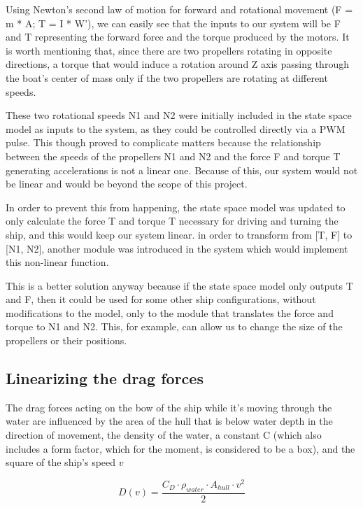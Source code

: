 Using Newton's second law of motion for forward  and rotational movement (F = m * A; T = I * W'), we can easily see that the inputs to our system will be F and T representing the forward force and the torque produced by the motors. It is worth mentioning that, since there are two propellers rotating in opposite directions, a torque that would induce a rotation around Z axis passing through the boat's center of mass only if the two propellers are rotating at different speeds.

These two rotational speeds N1 and N2 were initially included in the state space model as inputs to the system, as they could be controlled directly via a PWM pulse. This though proved to complicate matters because the relationship between the speeds of the propellers N1 and N2 and the force F and torque T generating accelerations is not a linear one. Because of this, our system would not be linear and would be beyond the scope of this project. 


In order to prevent this from happening, the state space model was updated to only calculate the force T and torque T necessary for driving and turning the ship, and this would keep our system linear. in order to transform from [T, F] to [N1, N2], another module was introduced in the system which would implement this non-linear function. 

This is a better solution anyway because if the state space model only outputs T and F, then it could be used for some other ship configurations, without modifications to the model, only to the module that translates the force and torque to N1 and N2. This, for example, can allow us to change the size of the propellers or their positions.

\subsection{Linearizing the drag forces}

The drag forces acting on the bow of the ship while it's moving through the water are influenced by the area of the hull that is below water depth in the direction of movement, the density of the water, a constant C (which also includes a form factor, which for the moment, is considered to be a box), and the square of the ship's speed $ v $

\[ D(v) = \frac{C_{D}\cdot\rho_{water}\cdot A_{hull}\cdot v^{2}}{2} \]

